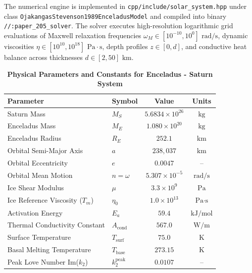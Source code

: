 \documentclass[11pt,a4paper]{article}
\begin{document}
The numerical engine is implemented in \texttt{cpp/include/solar\_system.hpp} under class \texttt{OjakangasStevenson1989EnceladusModel} and compiled into binary \texttt{//:paper\_205\_solver}. The solver executes high-resolution logarithmic grid evaluations of Maxwell relaxation frequencies $\omega_M \in [10^{-10}, 10^0]\text{ rad/s}$, dynamic viscosities $\eta \in [10^{10}, 10^{18}]\text{ Pa}\cdot\text{s}$, depth profiles $z \in [0, d]$, and conductive heat balance across thicknesses $d \in [2, 50]\text{ km}$.

\begin{table}[H]
\centering
\small
\caption{\textbf{Physical Parameters and Constants for Enceladus - Saturn System}}
\begin{tabular}{llcc}
\toprule
\textbf{Parameter} & \textbf{Symbol} & \textbf{Value} & \textbf{Units} \\
\midrule
Saturn Mass & $M_S$ & $5.6834 \times 10^{26}$ & $\text{kg}$ \\
Enceladus Mass & $M_E$ & $1.080 \times 10^{20}$ & $\text{kg}$ \\
Enceladus Radius & $R_E$ & $252.1$ & $\text{km}$ \\
Orbital Semi-Major Axis & $a$ & $238,037$ & $\text{km}$ \\
Orbital Eccentricity & $e$ & $0.0047$ & -- \\
Orbital Mean Motion & $n = \omega$ & $5.307 \times 10^{-5}$ & $\text{rad/s}$ \\
Ice Shear Modulus & $\mu$ & $3.3 \times 10^9$ & $\text{Pa}$ \\
Ice Reference Viscosity ($T_m$) & $\eta_0$ & $1.0 \times 10^{13}$ & $\text{Pa}\cdot\text{s}$ \\
Activation Energy & $E_a$ & $59.4$ & $\text{kJ/mol}$ \\
Thermal Conductivity Constant & $A_{\text{cond}}$ & $567.0$ & $\text{W/m}$ \\
Surface Temperature & $T_{\text{surf}}$ & $75.0$ & $\text{K}$ \\
Basal Melting Temperature & $T_{\text{base}}$ & $273.15$ & $\text{K}$ \\
Peak Love Number Im($k_2$) & $k_2^{\text{peak}}$ & $0.0107$ & -- \\
\bottomrule
\end{tabular}
\label{tab:params}
\end{table}

\end{document}
